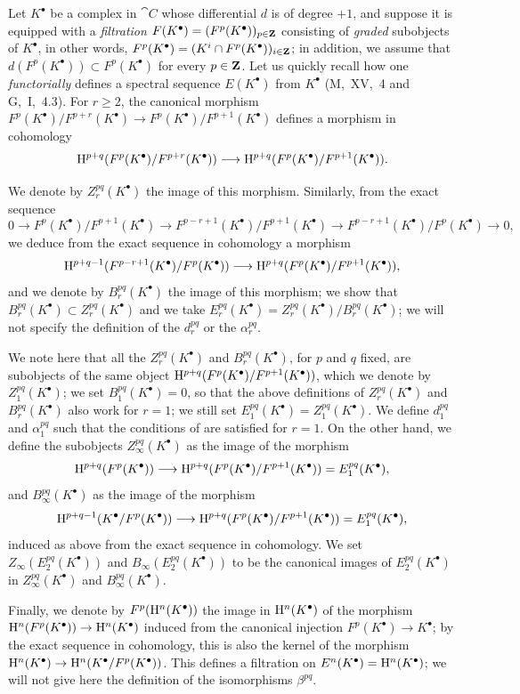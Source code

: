 \begin{env}[11.2.2]
\label{0.11.2.2}
Let $K^\bullet$ be a complex in $\cat{C}$ whose differential $d$ is of degree $+1$, and suppose it is equipped with a \emph{filtration $F(K^\bullet)=(F^p(K^\bullet))_{p\in\mathbf{Z}}$} consisting of \emph{graded} subobjects
of $K^\bullet$, in other words, $F^p(K^\bullet)=(K^i\cap F^p(K^\bullet))_{i\in\mathbf{Z}}$; in addition, we assume that $d(F^p(K^\bullet))\subset F^p(K^\bullet)$ for every $p\in\mathbf{Z}$.
Let us quickly recall how one \emph{functorially} defines a spectral sequence $E(K^\bullet)$ from $K^\bullet$ (M,~XV,~4 and G,~I,~4.3).
For $r\geq 2$, the canonical morphism $F^p(K^\bullet)/F^{p+r}(K^\bullet)\to F^p(K^\bullet)/F^{p+1}(K^\bullet)$ defines a morphism in cohomology
\[
  \HH^{p+q}(F^p(K^\bullet)/F^{p+r}(K^\bullet))\to\HH^{p+q}(F^p(K^\bullet)/F^{p+1}(K^\bullet)).
\]

We denote by $Z_r^{pq}(K^\bullet)$ the image of this morphism.
Similarly, from the exact sequence
\[
  0\to F^p(K^\bullet)/F^{p+1}(K^\bullet)\to F^{p-r+1}(K^\bullet)/F^{p+1}(K^\bullet)\to F^{p-r+1}(K^\bullet)/F^p(K^\bullet)\to 0,
\]
we deduce from the exact sequence in cohomology a morphism
\[
  \HH^{p+q-1}(F^{p-r+1}(K^\bullet)/F^p(K^\bullet))\to\HH^{p+q}(F^p(K^\bullet)/F^{p+1}(K^\bullet)),
\]
and we denote by $B_r^{pq}(K^\bullet)$ the image of this morphism; we show that $B_r^{pq}(K^\bullet)\subset Z_r^{pq}(K^\bullet)$ and we take $E_r^{pq}(K^\bullet)=Z_r^{pq}(K^\bullet)/B_r^{pq}(K^\bullet)$; we will not specify the definition of the $d_r^{pq}$ or the $\alpha_r^{pq}$.

We note here that all the $Z_r^{pq}(K^\bullet)$ and $B_r^{pq}(K^\bullet)$, for $p$ and $q$ fixed, are subobjects of the same object $\mathrm{H}^{p+q}(F^p(K^\bullet)/F^{p+1}(K^\bullet))$, which we denote by $Z_1^{pq}(K^\bullet)$; we set $B_1^{pq}(K^\bullet)=0$, so that the above definitions of $Z_r^{pq}(K^\bullet)$ and $B_r^{pq}(K^\bullet)$ also work for $r=1$; we still set $E_1^{pq}(K^\bullet)=Z_1^{pq}(K^\bullet)$.
We define $d_1^{pq}$ and $\alpha_1^{pq}$ such that the conditions of  are satisfied for $r=1$.
On the other hand, we define the subobjects $Z_\infty^{pq}(K^\bullet)$ as the image of the morphism
\[
  \HH^{p+q}(F^p(K^\bullet))\to\HH^{p+q}(F^p(K^\bullet)/F^{p+1}(K^\bullet))=E_1^{pq}(K^\bullet),
\]
and $B_\infty^{pq}(K^\bullet)$ as the image of the morphism
\[
  \HH^{p+q-1}(K^\bullet/F^p(K^\bullet))\to\HH^{p+q}(F^p(K^\bullet)/F^{p+1}(K^\bullet))=E_1^{pq}(K^\bullet),
\]
induced as above from the exact sequence in cohomology.
We set $Z_\infty(E_2^{pq}(K^\bullet))$ and $B_\infty(E_2^{pq}(K^\bullet))$ to be the canonical images of $E_2^{pq}(K^\bullet)$ in $Z_\infty^{pq}(K^\bullet)$ and $B_\infty^{pq}(K^\bullet)$.

Finally, we denote by $F^p(\mathrm{H}^n(K^\bullet))$ the image in $\mathrm{H}^n(K^\bullet)$ of the morphism $\HH^n(F^p(K^\bullet))\to\HH^n(K^\bullet)$ induced from the canonical injection $F^p(K^\bullet)\to K^\bullet$; by the exact sequence in cohomology, this is also the kernel of the morphism $\HH^n(K^\bullet)\to\HH^n(K^\bullet/F^p(K^\bullet))$.
This defines a filtration on $E^n(K^\bullet)=\mathrm{H}^n(K^\bullet)$; we will not give here the definition of the isomorphisms $\beta^{pq}$.
\end{env}
